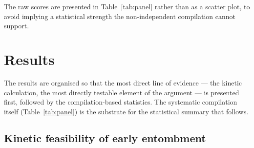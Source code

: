 \documentclass[11pt]{article}
\begin{document}
\noindent The raw scores are presented in Table~\ref{tab:panel} rather than as a scatter plot, to
avoid implying a statistical strength the non-independent compilation cannot support.

\section{Results}

The results are organised so that the most direct line of evidence --- the kinetic calculation,
the most directly testable element of the argument --- is presented first, followed by the
compilation-based statistics. The systematic compilation itself (Table~\ref{tab:panel}) is the
substrate for the statistical summary that follows.

\subsection{Kinetic feasibility of early entombment}
\end{document}
